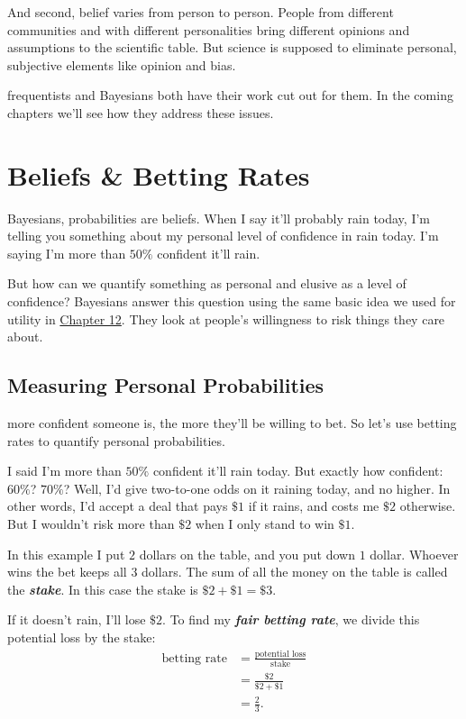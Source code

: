 \documentclass[justified]{tufte-book}
\theoremstyle{definition}
\theoremstyle{definition}
\theoremstyle{definition}
\theoremstyle{remark}
\begin{document}
And second, belief varies from person to person. People from different communities and with different personalities bring different opinions and assumptions to the scientific table. But science is supposed to eliminate personal, subjective elements like opinion and bias.

 frequentists and Bayesians both have their work cut out for them. In the coming chapters we'll see how they address these issues.

\hypertarget{beliefs-betting-rates}{%
\chapter{Beliefs \& Betting Rates}\label{beliefs-betting-rates}}

 Bayesians, probabilities are beliefs. When I say it'll probably rain today, I'm telling you something about my personal level of confidence in rain today. I'm saying I'm more than \(50\%\) confident it'll rain.

But how can we quantify something as personal and elusive as a level of confidence? Bayesians answer this question using the same basic idea we used for utility in \protect\hyperlink{utility}{Chapter 12}. They look at people's willingness to risk things they care about.

\hypertarget{measuring-personal-probabilities}{%
\section{Measuring Personal Probabilities}\label{measuring-personal-probabilities}}

 more confident someone is, the more they'll be willing to bet. So let's use betting rates to quantify personal probabilities.

I said I'm more than \(50\%\) confident it'll rain today. But exactly how confident: \(60\%\)? \(70\%\)? Well, I'd give two-to-one odds on it raining today, and no higher. In other words, I'd accept a deal that pays \(\$1\) if it rains, and costs me \(\$2\) otherwise. But I wouldn't risk more than \(\$2\) when I only stand to win \(\$1\).

In this example I put \(2\) dollars on the table, and you put down \(1\) dollar. Whoever wins the bet keeps all \(3\) dollars. The sum of all the money on the table is called the \textbf{\emph{stake}}. In this case the stake is \(\$2 + \$1 = \$3\).

If it doesn't rain, I'll lose \(\$2\). To find my \textbf{\emph{fair betting rate}}, we divide this potential loss by the stake:
\[
  \begin{aligned}
    \mbox{betting rate} &= \frac{\mbox{potential loss}}{\mbox{stake}}\\
                        &= \frac{\$2}{\$2 + \$1}\\
                        &= \frac{2}{3}.
  \end{aligned}
\]
\end{document}
